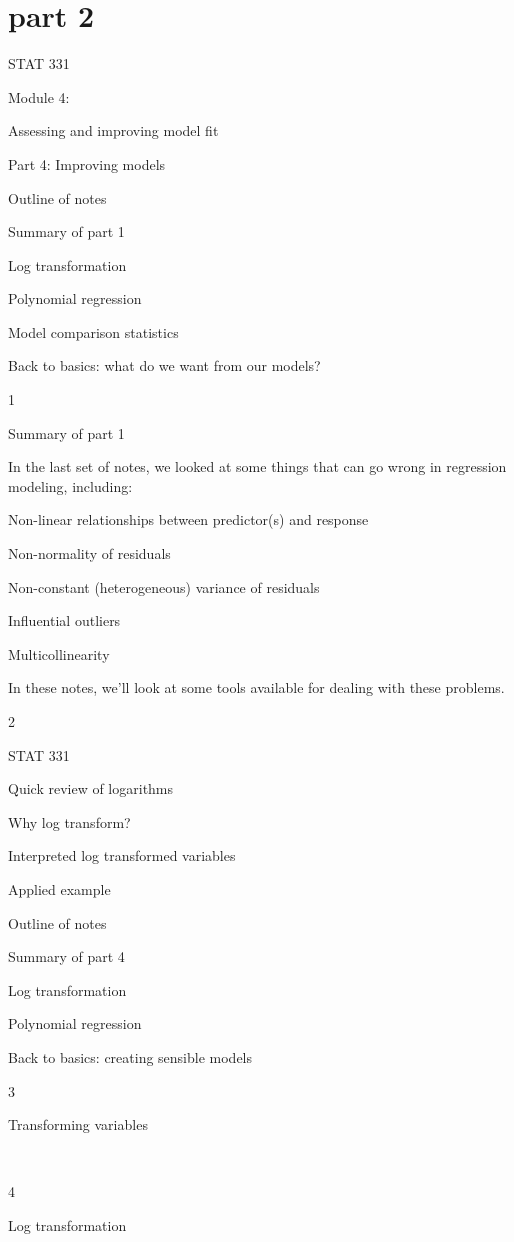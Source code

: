 \documentclass[
  letterpaper,
  DIV=11,
  numbers=noendperiod]{scrreprt}
\begin{document}
\hypertarget{part-2}{%
\section{part 2}\label{part-2}}

STAT 331

Module 4:

Assessing and improving model fit

Part 4: Improving models

Outline of notes

Summary of part 1

Log transformation

Polynomial regression

Model comparison statistics

Back to basics: what do we want from our models?

1

Summary of part 1

In the last set of notes, we looked at some things that can go wrong in
regression modeling, including:

Non-linear relationships between predictor(s) and response

Non-normality of residuals

Non-constant (heterogeneous) variance of residuals

Influential outliers

Multicollinearity

In these notes, we'll look at some tools available for dealing with
these problems.

2

STAT 331

Quick review of logarithms

Why log transform?

Interpreted log transformed variables

Applied example

Outline of notes

Summary of part 4

Log transformation

Polynomial regression

Back to basics: creating sensible models

3

Transforming variables

~

4

Log transformation

~
\end{document}
